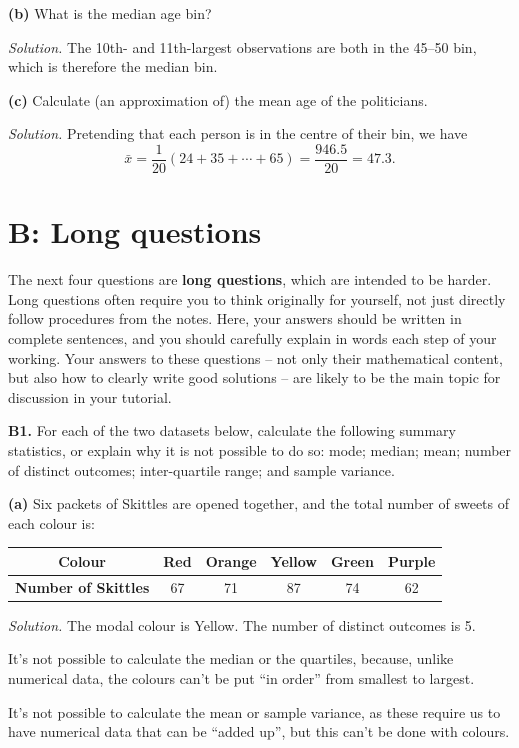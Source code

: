 \documentclass[
  a4paper,
]{book}
\theoremstyle{definition}
\theoremstyle{definition}
\theoremstyle{definition}
\theoremstyle{definition}
\theoremstyle{remark}
\begin{document}
\textbf{(b)} What is the median age bin?

\begin{myanswers}
\emph{Solution.} The 10th- and 11th-largest observations are both in the 45--50 bin, which is therefore the median bin.

\end{myanswers}

\textbf{(c)} Calculate (an approximation of) the mean age of the politicians.

\begin{myanswers}
\emph{Solution.}
Pretending that each person is in the centre of their bin, we have
\[ \bar x = \frac{1}{20} (24 + 35 + \cdots + 65) = \frac{946.5}{20} = 47.3 . \]

\end{myanswers}

\hypertarget{P1-long}{%
\section*{B: Long questions}\label{P1-long}}

The next four questions are \textbf{long questions}, which are intended to be harder. Long questions often require you to think originally for yourself, not just directly follow procedures from the notes. Here, your answers should be written in complete sentences, and you should carefully explain in words each step of your working. Your answers to these questions -- not only their mathematical content, but also how to clearly write good solutions -- are likely to be the main topic for discussion in your tutorial.

\textbf{B1.} For each of the two datasets below, calculate the following summary statistics, or explain why it is not possible to do so: mode; median; mean; number of distinct outcomes; inter-quartile range; and sample variance.

\textbf{(a)} Six packets of Skittles are opened together, and the total number of sweets of each colour is:

\begin{longtable}[]{@{}cccccc@{}}
\toprule
\textbf{Colour} & Red & Orange & Yellow & Green & Purple \\
\midrule
\endhead
\textbf{Number of Skittles} & 67 & 71 & 87 & 74 & 62 \\
\bottomrule
\end{longtable}

\begin{myanswers}
\emph{Solution.}
The modal colour is Yellow. The number of distinct outcomes is 5.

It's not possible to calculate the median or the quartiles, because, unlike numerical data, the colours can't be put ``in order'' from smallest to largest.

It's not possible to calculate the mean or sample variance, as these require us to have numerical data that can be ``added up'', but this can't be done with colours.

\end{myanswers}
\end{document}
